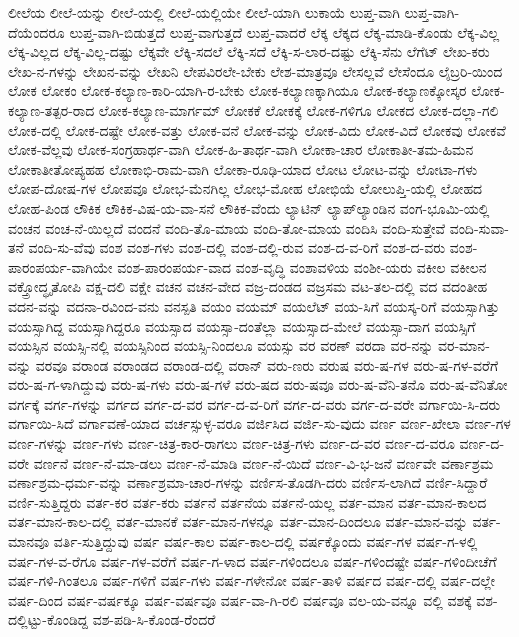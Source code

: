 ಲೀಲೆಯ
ಲೀಲೆ-ಯನ್ನು
ಲೀಲೆ-ಯಲ್ಲಿ
ಲೀಲೆ-ಯಲ್ಲಿಯೇ
ಲೀಲೆ-ಯಾಗಿ
ಲುಕಾಯೆ
ಲುಪ್ತ-ವಾಗಿ
ಲುಪ್ತ-ವಾಗಿ-ದೆಯೆಂದರೂ
ಲುಪ್ತ-ವಾಗಿ-ಬಿಡುತ್ತದೆ
ಲುಪ್ತ-ವಾಗುತ್ತದೆ
ಲುಪ್ತ-ವಾದರೆ
ಲೆಕ್ಕ
ಲೆಕ್ಕದ
ಲೆಕ್ಕ-ಮಾಡಿ-ಕೊಂಡು
ಲೆಕ್ಕ-ವಿಲ್ಲ
ಲೆಕ್ಕ-ವಿಲ್ಲದ
ಲೆಕ್ಕ-ವಿಲ್ಲ-ದಷ್ಟು
ಲೆಕ್ಕವೇ
ಲೆಕ್ಕಿ-ಸದಲೆ
ಲೆಕ್ಕಿ-ಸದೆ
ಲೆಕ್ಕಿ-ಸ-ಲಾರ-ದಷ್ಟು
ಲೆಕ್ಕಿ-ಸೆನು
ಲೆಗೆಟ್
ಲೇಖ-ಕರು
ಲೇಖ-ನ-ಗಳನ್ನು
ಲೇಖನ-ವನ್ನು
ಲೇಖನಿ
ಲೇಪವಿರಲೇ-ಬೇಕು
ಲೇಶ-ಮಾತ್ರವೂ
ಲೇಸಲ್ಲವೆ
ಲೇಸೆಂದೂ
ಲೈಬ್ರರಿ-ಯಿಂದ
ಲೋಕ
ಲೋಕಂ
ಲೋಕ-ಕಲ್ಯಾಣ-ಕಾರಿ-ಯಾಗಿ-ರ-ಬೇಕು
ಲೋಕ-ಕಲ್ಯಾಣಕ್ಕಾಗಿಯೂ
ಲೋಕ-ಕಲ್ಯಾಣಕ್ಕೋಸ್ಕರ
ಲೋಕ-ಕಲ್ಯಾಣ-ತತ್ಪರ-ರಾದ
ಲೋಕ-ಕಲ್ಯಾಣ-ಮಾರ್ಗಮ್
ಲೋಕಕೆ
ಲೋಕಕ್ಕೆ
ಲೋಕ-ಗಳಿಗೂ
ಲೋಕದ
ಲೋಕ-ದಲ್ಲಾ-ಗಲಿ
ಲೋಕ-ದಲ್ಲಿ
ಲೋಕ-ದಷ್ಟೇ
ಲೋಕ-ವತ್ತು
ಲೋಕ-ವನೆ
ಲೋಕ-ವನ್ನು
ಲೋಕ-ವಿದು
ಲೋಕ-ವಿದೆ
ಲೋಕವು
ಲೋಕವೆ
ಲೋಕ-ವೆಲ್ಲವು
ಲೋಕ-ಸಂಗ್ರಹಾರ್ಥ-ವಾಗಿ
ಲೋಕ-ಹಿ-ತಾರ್ಥ-ವಾಗಿ
ಲೋಕಾ-ಚಾರ
ಲೋಕಾತೀ-ತಮ-ಹಿಮನ
ಲೋಕಾತೀತೋಪ್ಯಹಹ
ಲೋಕಾಭಿ-ರಾಮ-ವಾಗಿ
ಲೋಕಾ-ರೂಢಿ-ಯಾದ
ಲೋಟ
ಲೋಟ-ವನ್ನು
ಲೋಟಾ-ಗಳು
ಲೋಪ-ದೋಷ-ಗಳ
ಲೋಪವೂ
ಲೋಭ-ಮೆನಗಿಲ್ಲ
ಲೋಭ-ಮೋಹ
ಲೋಭಿಯೆ
ಲೋಲುಪ್ತಿ-ಯಲ್ಲಿ
ಲೋಹದ
ಲೋಹ-ಪಿಂಡ
ಲೌಕಿಕ
ಲೌಕಿಕ-ವಿಷ-ಯ-ವಾ-ಸನೆ
ಲೌಕಿಕ-ವೆಂದು
ಲ್ಯಾಟಿನ್
ಲ್ಯಾಪ್‌ಲ್ಯಾಂಡಿನ
ವಂಗ-ಭೂಮಿ-ಯಲ್ಲಿ
ವಂಚನ
ವಂಚ-ನೆ-ಯಿಲ್ಲದೆ
ವಂದನೆ
ವಂದಿ-ತೊ-ಮಾಯ
ವಂದಿ-ತೋ-ಮಾಯ
ವಂದಿಸಿ
ವಂದಿ-ಸುತ್ತೇವೆ
ವಂದಿ-ಸುವಾ-ತನೆ
ವಂದಿ-ಸು-ವೆವು
ವಂಶ
ವಂಶ-ಗಳು
ವಂಶ-ದಲ್ಲಿ
ವಂಶ-ದಲ್ಲಿ-ರುವ
ವಂಶ-ದ-ವ-ರಿಗೆ
ವಂಶ-ದ-ವರು
ವಂಶ-ಪಾರಂಪರ್ಯ-ವಾಗಿಯೇ
ವಂಶ-ಪಾರಂಪರ್ಯ-ವಾದ
ವಂಶ-ವೃದ್ಧಿ
ವಂಶಾವಳಿಯ
ವಂಶೀ-ಯರು
ವಕೀಲ
ವಕೀಲನ
ವಕ್ತ್ರೋದ್ಧೃತೋಪಿ
ವಕ್ಷ-ದಲಿ
ವಕ್ಷೇ
ವಚನ
ವಚನ-ವೇದ
ವಜ್ರ-ದಂಡದ
ವಜ್ರಸಮ
ವಟ-ತಲ-ದಲ್ಲಿ
ವದ
ವದಂತೀಹ
ವದನ-ವನ್ನು
ವದನಾ-ರವಿಂದ-ವನು
ವನಸ್ಪತಿ
ವಯಂ
ವಯಮ್
ವಯಲೆಟ್
ವಯ-ಸಿಗೆ
ವಯಸ್ಕ-ರಿಗೆ
ವಯಸ್ಸಾಗಿತ್ತು
ವಯಸ್ಸಾಗಿದ್ದ
ವಯಸ್ಸಾಗಿದ್ದರೂ
ವಯಸ್ಸಾದ
ವಯಸ್ಸಾ-ದಂತೆಲ್ಲಾ
ವಯಸ್ಸಾದ-ಮೇಲೆ
ವಯಸ್ಸಾ-ದಾಗ
ವಯಸ್ಸಿಗೆ
ವಯಸ್ಸಿನ
ವಯಸ್ಸಿ-ನಲ್ಲಿ
ವಯಸ್ಸಿನಿಂದ
ವಯಸ್ಸಿ-ನಿಂದಲೂ
ವಯಸ್ಸು
ವರ
ವರಣ್
ವರದಾ
ವರ-ನನ್ನು
ವರ-ಮಾನ-ವನ್ನು
ವರವೂ
ವರಾಂಡ
ವರಾಂಡದ
ವರಾಂಡ-ದಲ್ಲಿ
ವರಾನ್
ವರು-ಣರು
ವರುಷ
ವರು-ಷ-ಗಳ
ವರು-ಷ-ಗಳ-ವರೆಗೆ
ವರು-ಷ-ಗ-ಳಾಗಿದ್ದುವು
ವರು-ಷ-ಗಳು
ವರು-ಷ-ಗಳೆ
ವರು-ಷದ
ವರು-ಷವೂ
ವರು-ಷ-ವೆನಿ-ತನೊ
ವರು-ಷ-ವೆನಿತೋ
ವರ್ಗಕ್ಕೆ
ವರ್ಗ-ಗಳನ್ನು
ವರ್ಗದ
ವರ್ಗ-ದ-ವರ
ವರ್ಗ-ದ-ವ-ರಿಗೆ
ವರ್ಗ-ದ-ವರು
ವರ್ಗ-ದ-ವರೇ
ವರ್ಗಾಯಿ-ಸಿ-ದರು
ವರ್ಗಾಯಿ-ಸಿದೆ
ವರ್ಗಾವಣೆ-ಯಾದ
ವರ್ಚಸ್ಸುಳ್ಳ-ವರೂ
ವರ್ಜಿಸಿದ
ವರ್ಜಿ-ಸು-ವುದು
ವರ್ಣ
ವರ್ಣ-ಖೇಲಾ
ವರ್ಣ-ಗಳ
ವರ್ಣ-ಗಳನ್ನು
ವರ್ಣ-ಗಳು
ವರ್ಣ-ಚಿತ್ರ-ಕಾರ-ರಾಗಲು
ವರ್ಣ-ಚಿತ್ರ-ಗಳು
ವರ್ಣ-ದ-ವರ
ವರ್ಣ-ದ-ವರೂ
ವರ್ಣ-ದ-ವರೇ
ವರ್ಣನೆ
ವರ್ಣ-ನೆ-ಮಾ-ಡಲು
ವರ್ಣ-ನೆ-ಮಾಡಿ
ವರ್ಣ-ನೆ-ಯಿದೆ
ವರ್ಣ-ವಿ-ಭ-ಜನೆ
ವರ್ಣವೇ
ವರ್ಣಾಶ್ರಮ
ವರ್ಣಾಶ್ರಮ-ಧರ್ಮ-ವನ್ನು
ವರ್ಣಾಶ್ರಮಾ-ಚಾರ-ಗಳನ್ನು
ವರ್ಣಿಸ-ತೊಡಗಿ-ದರು
ವರ್ಣಿಸ-ಲಾಗಿದೆ
ವರ್ಣಿ-ಸಿದ್ದಾರೆ
ವರ್ಣಿ-ಸುತ್ತಿದ್ದರು
ವರ್ತ-ಕರ
ವರ್ತ-ಕರು
ವರ್ತನೆ
ವರ್ತನೆಯ
ವರ್ತನೆ-ಯಲ್ಲ
ವರ್ತ-ಮಾನ
ವರ್ತ-ಮಾನ-ಕಾಲದ
ವರ್ತ-ಮಾನ-ಕಾಲ-ದಲ್ಲಿ
ವರ್ತ-ಮಾನಕೆ
ವರ್ತ-ಮಾನ-ಗಳನ್ನೂ
ವರ್ತ-ಮಾನ-ದಿಂದಲೂ
ವರ್ತ-ಮಾನ-ವನ್ನು
ವರ್ತ-ಮಾನವೂ
ವರ್ತಿ-ಸುತ್ತಿದ್ದುವು
ವರ್ಷ
ವರ್ಷ-ಕಾಲ
ವರ್ಷ-ಕಾಲ-ದಲ್ಲಿ
ವರ್ಷಕ್ಕೊಂದು
ವರ್ಷ-ಗಳ
ವರ್ಷ-ಗ-ಳಲ್ಲಿ
ವರ್ಷ-ಗಳ-ವ-ರೆಗೂ
ವರ್ಷ-ಗಳ-ವರೆಗೆ
ವರ್ಷ-ಗ-ಳಾದ
ವರ್ಷ-ಗಳಿಂದಲೂ
ವರ್ಷ-ಗಳಿಂದಷ್ಟೇ
ವರ್ಷ-ಗಳಿಂದೀಚೆಗೆ
ವರ್ಷ-ಗಳಿ-ಗಿಂತಲೂ
ವರ್ಷ-ಗಳಿಗೆ
ವರ್ಷ-ಗಳು
ವರ್ಷ-ಗಳೇನೋ
ವರ್ಷ-ತಾಳಿ
ವರ್ಷದ
ವರ್ಷ-ದಲ್ಲಿ
ವರ್ಷ-ದಲ್ಲೇ
ವರ್ಷ-ದಿಂದ
ವರ್ಷ-ವರ್ಷಕ್ಕೂ
ವರ್ಷ-ವರ್ಷವೂ
ವರ್ಷ-ವಾ-ಗಿ-ರಲಿ
ವರ್ಷವೂ
ವಲ-ಯ-ವನ್ನೂ
ವಲ್ಲಿ
ವಶಕ್ಕೆ
ವಶ-ದಲ್ಲಿಟ್ಟು-ಕೊಂಡಿದ್ದ
ವಶ-ಪಡಿ-ಸಿ-ಕೊಂಡ-ರೆಂದರೆ
